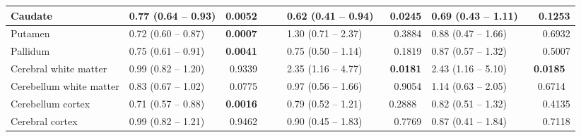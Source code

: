 \begin{sidewaystable}
{\begin{tabular}{|l|lr|lr|lr|lr|}
\hline
Caudate & \textcolor[rgb]{0.2,0.2,0.2}{0.77 (0.64 -- 0.93)} & \textcolor[rgb]{0.2,0.2,0.2}{\textbf{0.0052}} & {\cellcolor[rgb]{0.753,0.753,0.753}} & {\cellcolor[rgb]{0.753,0.753,0.753}} & \textcolor[rgb]{0.2,0.2,0.2}{0.62 (0.41 -- 0.94)~} & \textcolor[rgb]{0.2,0.2,0.2}{\textbf{0.0245}} & \textcolor[rgb]{0.2,0.2,0.2}{0.69 (0.43 -- 1.11)~} & \textcolor[rgb]{0.2,0.2,0.2}{0.1253} \\ 
\hline
Putamen & \textcolor[rgb]{0.2,0.2,0.2}{0.72 (0.60 -- 0.87)} & \textcolor[rgb]{0.2,0.2,0.2}{\textbf{0.0007}} & {\cellcolor[rgb]{0.753,0.753,0.753}} & {\cellcolor[rgb]{0.753,0.753,0.753}} & \textcolor[rgb]{0.2,0.2,0.2}{1.30 (0.71 -- 2.37)~} & \textcolor[rgb]{0.2,0.2,0.2}{0.3884} & \textcolor[rgb]{0.2,0.2,0.2}{0.88 (0.47 -- 1.66)~} & \textcolor[rgb]{0.2,0.2,0.2}{0.6932} \\ 
\hline
Pallidum & \textcolor[rgb]{0.2,0.2,0.2}{0.75 (0.61 -- 0.91)} & \textcolor[rgb]{0.2,0.2,0.2}{\textbf{0.0041}} & {\cellcolor[rgb]{0.753,0.753,0.753}} & {\cellcolor[rgb]{0.753,0.753,0.753}} & \textcolor[rgb]{0.2,0.2,0.2}{0.75 (0.50 -- 1.14)~} & \textcolor[rgb]{0.2,0.2,0.2}{0.1819} & \textcolor[rgb]{0.2,0.2,0.2}{0.87 (0.57 -- 1.32)~} & \textcolor[rgb]{0.2,0.2,0.2}{0.5007} \\ 
\hline
Cerebral white matter & \textcolor[rgb]{0.2,0.2,0.2}{0.99 (0.82 -- 1.20)} & \textcolor[rgb]{0.2,0.2,0.2}{0.9339} & {\cellcolor[rgb]{0.753,0.753,0.753}} & {\cellcolor[rgb]{0.753,0.753,0.753}} & \textcolor[rgb]{0.2,0.2,0.2}{2.35 (1.16 -- 4.77)~} & \textcolor[rgb]{0.2,0.2,0.2}{\textbf{0.0181}} & \textcolor[rgb]{0.2,0.2,0.2}{2.43 (1.16 -- 5.10)~} & \textcolor[rgb]{0.2,0.2,0.2}{\textbf{0.0185}~} \\ 
\hline
Cerebellum white matter & \textcolor[rgb]{0.2,0.2,0.2}{0.83 (0.67 -- 1.02)} & \textcolor[rgb]{0.2,0.2,0.2}{0.0775} & {\cellcolor[rgb]{0.753,0.753,0.753}} & {\cellcolor[rgb]{0.753,0.753,0.753}} & \textcolor[rgb]{0.2,0.2,0.2}{0.97 (0.56 -- 1.66)~} & \textcolor[rgb]{0.2,0.2,0.2}{0.9054} & \textcolor[rgb]{0.2,0.2,0.2}{1.14 (0.63 -- 2.05)~} & \textcolor[rgb]{0.2,0.2,0.2}{0.6714~} \\ 
\hline
Cerebellum cortex & \textcolor[rgb]{0.2,0.2,0.2}{0.71 (0.57 -- 0.88)} & \textcolor[rgb]{0.2,0.2,0.2}{\textbf{0.0016}} & {\cellcolor[rgb]{0.753,0.753,0.753}} & {\cellcolor[rgb]{0.753,0.753,0.753}} & \textcolor[rgb]{0.2,0.2,0.2}{0.79 (0.52 -- 1.21)~} & \textcolor[rgb]{0.2,0.2,0.2}{0.2888~} & \textcolor[rgb]{0.2,0.2,0.2}{0.82 (0.51 -- 1.32)~} & \textcolor[rgb]{0.2,0.2,0.2}{0.4135} \\ 
\hline
Cerebral cortex & \textcolor[rgb]{0.2,0.2,0.2}{0.99 (0.82 -- 1.21)} & \textcolor[rgb]{0.2,0.2,0.2}{0.9462} & {\cellcolor[rgb]{0.753,0.753,0.753}} & {\cellcolor[rgb]{0.753,0.753,0.753}} & \textcolor[rgb]{0.2,0.2,0.2}{0.90 (0.45 -- 1.83)~} & \textcolor[rgb]{0.2,0.2,0.2}{0.7769} & \textcolor[rgb]{0.2,0.2,0.2}{0.87 (0.41 -- 1.84)~} & \textcolor[rgb]{0.2,0.2,0.2}{0.7118} \\
\hline
\end{tabular}
}
\end{sidewaystable}


